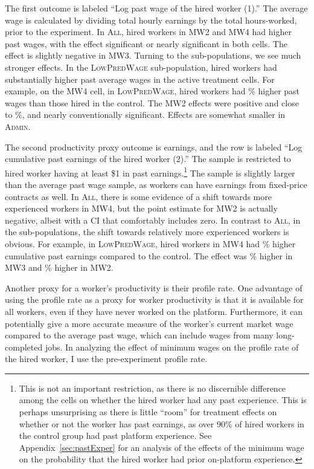 \documentclass[AER]{AEA}
\newcommand{\all}{\textsc{All}}
\newcommand{\admin}{\textsc{Admin}}
\newcommand{\lpw}{\textsc{LowPredWage}}
\begin{document}
The first outcome is labeled  ``Log past wage of the hired worker (1).'' 
The average wage is calculated by dividing total hourly earnings by the total hours-worked, prior to the experiment.
In \all{}, hired workers in MW2 and MW4 had higher past wages, with the effect significant or nearly significant in both cells. 
The effect is slightly negative in MW3. 
Turning to the sub-populations, we see much stronger effects.
In the \lpw{} sub-population, hired workers had substantially higher past average wages in the active treatment cells. 
For example, on the MW4 cell, in \lpw{}, hired workers had \LPWFourloghiredpastwpctchange{}\% higher past wages than those hired in the control.
The MW2 effects were positive and close to \LPWTwologhiredpastwpctchange{}\%, and nearly conventionally significant. 
Effects are somewhat smaller in \admin{}.

The second productivity proxy outcome is earnings, and the row is labeled ``Log cumulative past earnings of the hired worker (2).''
The sample is restricted to hired worker having at least \$1 in past earnings.\footnote{ 
  This is not an important restriction, as there is no discernible difference among the cells on whether the hired worker had any past experience. 
  This is perhaps unsurprising as there is little ``room'' for treatment effects on whether or not the worker has past earnings, as over 90\% of hired workers in the control group had past platform experience.
  See Appendix~\ref{sec:pastExper} for an analysis of the effects of the minimum wage on the probability that the hired worker had prior on-platform experience. 
}
The sample is slightly larger than the average past wage sample, as workers can have earnings from fixed-price contracts as well.
In \all{}, there is some evidence of a shift towards more experienced workers in MW4, but the point estimate for MW2 is actually negative, albeit with a CI that comfortably includes zero.
In contrast to \all{}, in the sub-populations, the shift towards relatively more experienced workers is obvious.
For example, in \lpw{}, hired workers in MW4 had \LPWFourloghiredpastypctchange{}\% higher cumulative past earnings compared to the control.
The effect was \LPWThreeloghiredpastypctchange{}\% higher in MW3 and \LPWTwologhiredpastypctchange{}\% higher in MW2.

Another proxy for a worker's productivity is their profile rate.
One advantage of using the profile rate as a proxy for worker productivity is that it is available for all workers, even if they have never worked on the platform. 
Furthermore, it can potentially give a more accurate measure of the worker's current market wage compared to the average past wage, which can include wages from many long-completed jobs.
In analyzing the effect of minimum wages on the profile rate of the hired worker, I use the pre-experiment profile rate. 
\end{document}
